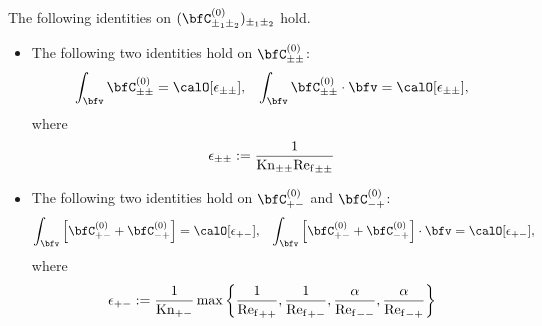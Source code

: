     \begin{lemma}\label{lem:phase-restricted conservation on local collision operators}
        The following identities on $(\bfC_{\pm_{1}\pm_{2}}^{(0)})_{\pm_{1}\pm_{2}}$ hold.
        \begin{itemize}
            \item  The following two identities hold on $\bfC_{\pm\pm}^{(0)}$:
            \begin{align}
                \int_{\bfv}\bfC_{\pm\pm}^{(0)}           =  \calO[\epsilon_{\pm\pm}],  &&
                \int_{\bfv}\bfC_{\pm\pm}^{(0)}\cdot\bfv  =  \calO[\epsilon_{\pm\pm}],
            \end{align}
            where
            \begin{equation}
                \epsilon_{\pm\pm}  :=  \frac{1}{\mathrm{Kn}_{\pm\pm}{\mathrm{Re}_{\mathrm{f}}}_{\pm\pm}}
            \end{equation}
            \item  The following two identities hold on $\bfC_{+-}^{(0)}$ and $\bfC_{-+}^{(0)}$:
            \begin{align}
                \int_{\bfv}\left[\bfC_{+-}^{(0)} + \bfC_{-+}^{(0)}\right]           =  \calO[\epsilon_{+-}],  &&
                \int_{\bfv}\left[\bfC_{+-}^{(0)} + \bfC_{-+}^{(0)}\right]\cdot\bfv  =  \calO[\epsilon_{+-}],
            \end{align}
            where
            \begin{equation}
                \epsilon_{+-}  :=  \frac{1}{\mathrm{Kn}_{+-}}\max\left\{\frac{1}{{\mathrm{Re}_{\mathrm{f}}}_{++}}, \frac{1}{{\mathrm{Re}_{\mathrm{f}}}_{+-}}, \frac{\alpha}{{\mathrm{Re}_{\mathrm{f}}}_{--}}, \frac{\alpha}{{\mathrm{Re}_{\mathrm{f}}}_{-+}}\right\}
            \end{equation}
        \end{itemize}
    \end{lemma}
